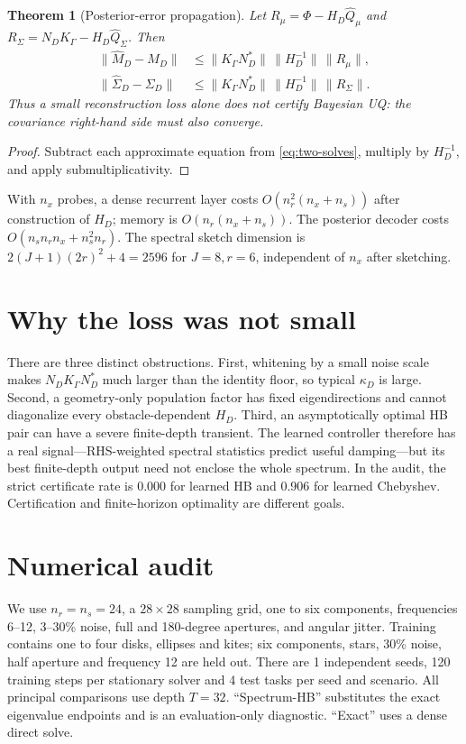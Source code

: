 \documentclass[10pt]{article}
\newtheorem{theorem}{Theorem}
\begin{document}
\begin{theorem}[Posterior-error propagation]
Let $R_\mu=\Phi-H_D\widehat Q_\mu$ and
$R_\Sigma=N_DK_\Gamma-H_D\widehat Q_\Sigma$.  Then
\begin{align*}
 \|\widehat M_D-M_D\|&\leq
 \|K_\Gamma N_D^*\|\,\|H_D^{-1}\|\,\|R_\mu\|,\\
 \|\widehat\Sigma_D-\Sigma_D\|&\leq
 \|K_\Gamma N_D^*\|\,\|H_D^{-1}\|\,\|R_\Sigma\|.
\end{align*}
Thus a small reconstruction loss alone does not certify Bayesian UQ: the
covariance right-hand side must also converge.
\end{theorem}
\begin{proof}
Subtract each approximate equation from \eqref{eq:two-solves}, multiply by
$H_D^{-1}$, and apply submultiplicativity.
\end{proof}

With $n_x$ probes, a dense recurrent layer costs
$O(n_r^2(n_x+n_s))$ after construction of $H_D$; memory is
$O(n_r(n_x+n_s))$.  The posterior decoder costs $O(n_sn_rn_x+n_s^2n_r)$.
The spectral sketch dimension is
$2(J+1)(2r)^2+4=2596$ for $J=8,r=6$, independent of $n_x$ after sketching.

\section{Why the loss was not small}
There are three distinct obstructions.  First, whitening by a small noise scale
makes $N_DK_\Gamma N_D^*$ much larger than the identity floor, so typical
$\kappa_D$ is large.  Second, a geometry-only population factor has fixed
eigendirections and cannot diagonalize every obstacle-dependent $H_D$.
Third, an asymptotically optimal HB pair can have a severe finite-depth
transient.  The learned controller therefore has a real signal---RHS-weighted
spectral statistics predict useful damping---but its best finite-depth output
need not enclose the whole spectrum.  In the audit, the strict certificate rate
is 0.000 for learned HB and 0.906 for learned
Chebyshev.  Certification and finite-horizon optimality are different goals.

\section{Numerical audit}
We use $n_r=n_s=24$, a
$28\times28$ sampling grid, one to six
components, frequencies 6--12, 3--30\% noise, full and 180-degree apertures,
and angular jitter.  Training contains one to four disks, ellipses and kites;
six components, stars, 30\% noise, half aperture and frequency 12 are held out.
There are 1 independent seeds, 120
training steps per stationary solver and 4
test tasks per seed and scenario.  All principal comparisons use depth
$T=32$.  ``Spectrum-HB'' substitutes the exact eigenvalue endpoints and is
an evaluation-only diagnostic.  ``Exact'' uses a dense direct solve.
\end{document}
